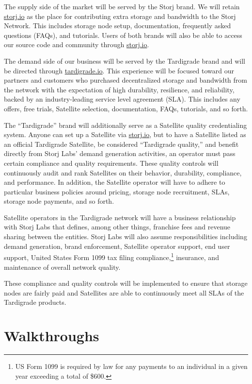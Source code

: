 \documentclass[8pt,fleqn,openany]{book}
\begin{document}
The supply side of the market will be served by the Storj brand.
We will retain \url{storj.io} as the place for contributing extra storage and
bandwidth to the Storj Network. This includes storage node setup, documentation,
frequently asked questions (FAQs), and tutorials. Users of both brands will also be able to
access our source code and community through \url{storj.io}.

The demand side of our business will be served by the Tardigrade brand and
will be directed through \url{tardigrade.io}.
This experience will be focused toward our partners and customers who purchased
decentralized storage and bandwidth from the network with the expectation of
high durability, resilience, and reliability, backed by an industry-leading
service level agreement (SLA). This includes any offers, free trials, Satellite
selection, documentation, FAQs, tutorials, and so forth.

The ``Tardigrade'' brand will additionally serve as a Satellite quality
credentialing system. Anyone can set up a Satellite via
\url{storj.io}, but to have a Satellite listed as an official Tardigrade
Satellite, be considered ``Tardigrade quality,'' and benefit directly from
Storj Labs' demand generation activities, an operator must pass
certain compliance and quality requirements.
These quality controls will continuously audit and rank Satellites on their
behavior, durability, compliance, and performance.
In addition, the Satellite operator will have to adhere to particular business
policies around pricing, storage node recruitment, SLAs, storage node payments,
and so forth.

Satellite operators in the Tardigrade network will have a business
relationship with Storj Labs that defines, among other things, franchise fees
and revenue sharing between the entities. Storj Labs will also assume
responsibilities including demand generation, brand enforcement, Satellite
operator support, end user support, United States Form 1099 tax filing
compliance,\footnote{US Form 1099 is required by law for any payments to an
individual in a given year exceeding a total of \$600.}
insurance, and maintenance of overall network quality.

These compliance and quality controls will be implemented to ensure that
storage nodes are fairly paid and Satellites are able to continuously meet all
SLAs of the Tardigrade products.

\chapter{Walkthroughs}\label{chap:walkthroughs}
\end{document}

